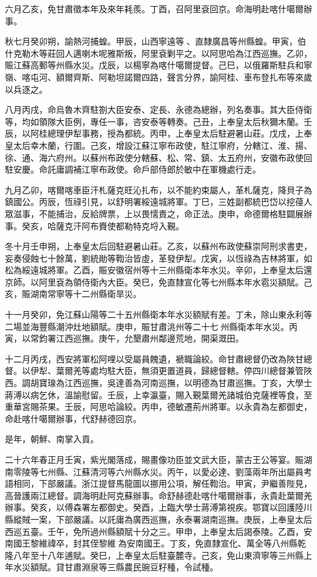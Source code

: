 \begin{pinyinscope}
六月乙亥，免甘肅徵本年及來年耗羨。丁酉，召阿里袞回京。命海明赴喀什噶爾辦事。

秋七月癸卯朔，諭熱河捕蝗。甲辰，山西寧遠等、直隸廣昌等州縣蝗。甲寅，伯什克勒木等莊回人邁喇木呢雅斯叛，阿里袞剿平之。以阿思哈為江西巡撫。乙卯，賑江蘇高郵等州縣水災。戊辰，以楊寧為喀什噶爾提督。己巳，以俄羅斯駐兵和寧嶺、喀屯河、額爾齊斯、阿勒坦諾爾四路，聲言分界，諭阿桂、車布登扎布等來歲以兵逐之。

八月丙戌，命烏魯木齊駐劄大臣安泰、定長、永德為總辦，列名奏事。其大臣侍衛等，均如領隊大臣例，專任一事，咨安泰等轉奏。己丑，上奉皇太后秋獮木蘭。壬辰，以阿桂總理伊犁事務，授為都統。丙申，上奉皇太后駐避暑山莊。戊戌，上奉皇太后幸木蘭，行圍。己亥，增設江蘇江寧布政使，駐江寧府，分轄江、淮、揚、徐、通、海六府州。以蘇州布政使分轄蘇、松、常、鎮、太五府州，安徽布政使回駐安慶。命託庸調補江寧布政使。命戶部侍郎於敏中在軍機處行走。

九月乙卯，喀爾喀車臣汗札薩克旺沁扎布，以不能約束屬人，革札薩克，降貝子為鎮國公。丙辰，恆祿引見，以舒明署綏遠城將軍。丁巳，三姓副都統巴岱以挖葠人眾滋事，不能捕治，反給牌票，上以畏懦責之，命正法。庚申，命德爾格駐闢展辦事。癸亥，哈薩克汗阿布賚使都勒特克埒入覲。

冬十月壬申朔，上奉皇太后回駐避暑山莊。乙亥，以蘇州布政使蘇崇阿刑求書吏，妄奏侵蝕七十餘萬，劉統勛等鞫治皆虛，革發伊犁。戊寅，以恆祿為吉林將軍，如松為綏遠城將軍。乙酉，賑安徽宿州等十三州縣衛本年水災。辛卯，上奉皇太后還京師。以阿里袞為領侍衛內大臣。癸巳，免直隸宣化等七州縣本年水雹災額賦。己亥，賑湖南常寧等十二州縣衛旱災。

十一月癸卯，免江蘇山陽等二十五州縣衛本年水災額賦有差。丁未，除山東永利等二場並海豐縣潮沖灶地額賦。庚申，賑甘肅洮州等二十七州縣衛本年水災。丙寅，以常鈞署江西巡撫。庚午，允墾肅州鄰邊荒地，開渠溉田。

十二月丙戌，西安將軍松阿哩以受屬員餽遺，褫職論絞。命甘肅總督仍改為陜甘總督。以伊犁、葉爾羌等處均駐大臣，無須更置道員，歸總督轄。停四川總督兼管陜西。調胡寶瑔為江西巡撫，吳達善為河南巡撫，以明德為甘肅巡撫。丁亥，大學士蔣溥以病乞休，溫諭慰留。壬辰，上幸瀛臺，賜入覲葉爾羌諸城伯克薩裡等食，至重華宮賜茶果。壬辰，阿思哈論絞。丙申，德敏遷荊州將軍。以永貴為左都御史，命赴喀什噶爾辦事，代舒赫德回京。

是年，朝鮮、南掌入貢。

二十六年春正月壬寅，紫光閣落成，賜畫像功臣並文武大臣，蒙古王公等宴。賑湖南零陵等七州縣、江蘇清河等六州縣水災。丙午，以愛必達、劉藻兩年所出屬員考語相同，下部嚴議。浙江提督馬龍圖以挪用公項，解任鞫治。甲寅，尹繼善陛見，高晉護兩江總督。調海明赴阿克蘇辦事。命舒赫德赴喀什噶爾辦事，永貴赴葉爾羌辦事。癸亥，以傅森署左都御史。癸酉，上臨大學士蔣溥第視疾。鄂寶以回護陸川縣縱賊一案，下部嚴議。以託庸為廣西巡撫，永泰署湖南巡撫。庚辰，上奉皇太后西巡五臺。壬午，免所過州縣額賦十分之三。甲申，上奉皇太后謁泰陵。乙酉，安南國王黎維禕卒，封其侄黎維為安南國王。丁亥，免直隸宣化、萬全等八州縣乾隆八年至十八年逋賦。癸巳，上奉皇太后駐臺麓寺。己亥，免山東濟寧等三州縣上年水災額賦。貸甘肅淵泉等三縣農民豌豆籽種，令試種。


\end{pinyinscope}
